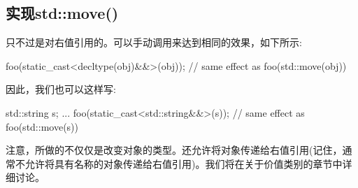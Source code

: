 \subsection{实现std::move()}

只不过是对右值引用的。可以手动调用来达到相同的效果，如下所示:

\begin{cppcode}
foo(static_cast<decltype(obj)&&>(obj)); // same effect as foo(std::move(obj))
\end{cppcode}

因此，我们也可以这样写:

\begin{cppcode}
std::string s;
...
foo(static_cast<std::string&&>(s)); // same effect as foo(std::move(s))
\end{cppcode}

注意，所做的不仅仅是改变对象的类型。还允许将对象传递给右值引用(记住，通常不允许将具有名称的对象传递给右值引用)。我们将在关于价值类别的章节中详细讨论。





























